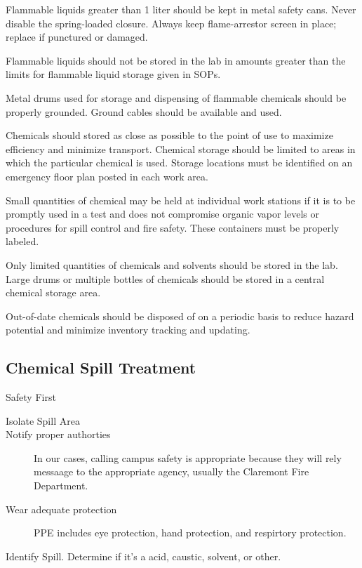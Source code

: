 \documentclass[12pt]{../SOP4_alpha}\usepackage[]{graphicx}\usepackage[]{color}
\begin{document}
\NP Flammable liquids greater than 1 liter should be kept in metal safety cans. Never disable the spring-loaded closure. Always keep flame-arrestor screen in place; replace if punctured or damaged. 

\NP Flammable liquids should not be stored in the lab in amounts greater than the limits for flammable liquid storage given in SOPs. 

\NP Metal drums used for storage and dispensing of flammable chemicals should be properly grounded. Ground cables should be available and used.

\NP Chemicals should stored as close as possible to the point of use to maximize efficiency and minimize transport. Chemical storage should be limited to areas in which the particular chemical is used. Storage locations must be identified on an emergency floor plan posted in each work area.

\NP Small quantities of chemical may be held at individual work stations if it is to be promptly used in a test and does not compromise organic vapor levels or procedures for spill control and fire safety. These containers must be properly labeled.

\NP Only limited quantities of chemicals and solvents should be stored in the lab. Large drums or multiple bottles of chemicals should be stored in a central chemical storage area.

\NP Out-of-date chemicals should be disposed of on a periodic basis to reduce hazard potential and minimize inventory tracking and updating.

\subsection*{Chemical Spill Treatment}

\NP Safety First

\begin{description}
\item[Isolate Spill Area] 
\item[Notify proper authorties] In our cases, calling campus safety is appropriate because they will rely messaage to the appropriate agency, usually the Claremont Fire Department.
\item[Wear adequate protection] PPE includes eye protection, hand protection, and respirtory protection. 
\end{description}

\NP Identify Spill. Determine if it's a acid, caustic, solvent, or other. 
\end{document}
